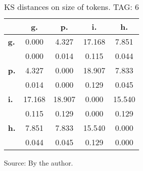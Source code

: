 \begin{table}[h!]
\begin{center}
\caption{KS distances on size of tokens. TAG: 6}
	\label{tab:kolTok}
\begin{tabular}{| l || c | c | c | c |}\hline
 & {\bf g.} & {\bf p.} & {\bf i.} & {\bf h.} \\\hline\hline
{\bf g.} & 0.000 & 4.327 & 17.168 & 7.851 \\
{\bf } & 0.000 & 0.014 & 0.115 & 0.044 \\\hline
{\bf p.} & 4.327 & 0.000 & 18.907 & 7.833 \\
{\bf } & 0.014 & 0.000 & 0.129 & 0.045 \\\hline
{\bf i.} & 17.168 & 18.907 & 0.000 & 15.540 \\
{\bf } & 0.115 & 0.129 & 0.000 & 0.129 \\\hline
{\bf h.} & 7.851 & 7.833 & 15.540 & 0.000 \\
{\bf } & 0.044 & 0.045 & 0.129 & 0.000 \\\hline
\end{tabular}
\begin{flushleft}
		Source: By the author.\
\end{flushleft}
\end{center}
\end{table}
